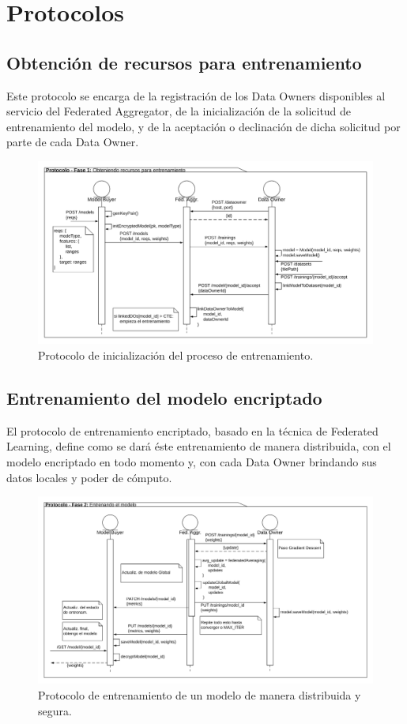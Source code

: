 \documentclass[
11pt, %
oneside, %
spanish, %
singlespacing, %
parskip, %
headsepline, %
chapterinoneline, %
]{MastersDoctoralThesis} %
\begin{document}
\section{Protocolos}

\subsection*{Obtención de recursos para entrenamiento}

Este protocolo se encarga  de la registración de los Data Owners disponibles al servicio del Federated Aggregator, de la inicialización de la solicitud de entrenamiento del modelo, y de la aceptación o declinación de dicha solicitud por parte de cada Data Owner. 

\begin{figure}[H]
  	\centering
	\includegraphics[scale=0.1]{imgs/flujo_fase1.png}
	\caption{Protocolo de inicialización del proceso de entrenamiento.}
\end{figure}

\subsection*{Entrenamiento del modelo encriptado}

El protocolo de entrenamiento encriptado, basado en la técnica de Federated Learning, define como se dará éste entrenamiento de manera distribuida, con el modelo encriptado en todo momento y, con cada Data Owner brindando sus datos locales y poder de cómputo.

\begin{figure}[H]
  	\centering
	\includegraphics[scale=0.1]{imgs/flujo_fase2.png}
	\caption{Protocolo de entrenamiento de un modelo de manera distribuida y segura.}
\end{figure}
\end{document}
